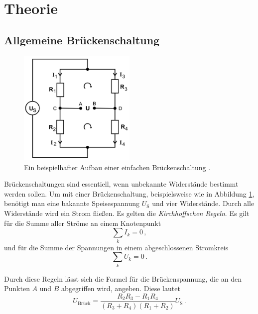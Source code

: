 \section{Theorie}
\label{sec:Theorie}

\subsection{Allgemeine Brückenschaltung}

\begin{figure}
    \centering
    \includegraphics[width=0.5\textwidth]{pictures/Schaltung1.png}
    \caption{Ein beispielhafter Aufbau einer einfachen Brückenschaltung \cite[1]{v302}.}
    \label{fig:Schaltung1}
\end{figure}

Brückenschaltungen sind essentiell, wenn unbekannte Widerstände bestimmt werden sollen.
Um mit einer Brückenschaltung, beispielsweise wie in Abbildung \ref{fig:Schaltung1},
benötigt man eine bakannte Speisespannung $U_\text{S}$ und vier Widerstände.
Durch alle Widerstände wird ein Strom fließen.
Es gelten die \textit{Kirchhoffschen Regeln}.
Es gilt für die Summe aller Ströme an einem Knotenpunkt
\begin{equation} \label{eq:kirch1}
    \sum_k I_k = 0 \, ,
\end{equation}
und für die Summe der Spannungen in einem abgeschlossenen Stromkreis
\begin{equation} \label{eq:kirch2}
    \sum_k U_k = 0 \, .
\end{equation}

Durch diese Regeln lässt sich die Formel für die Brückenspannung, die an den Punkten $A$ und $B$ abgegriffen wird,
angeben. Diese lautet
\begin{equation}
    U_\text{Brück} = \frac {R_2 R_3 - R_1 R_4} {(R_3 + R_4)(R_1 + R_2)} U_\text{S} \, .
\end{equation}

